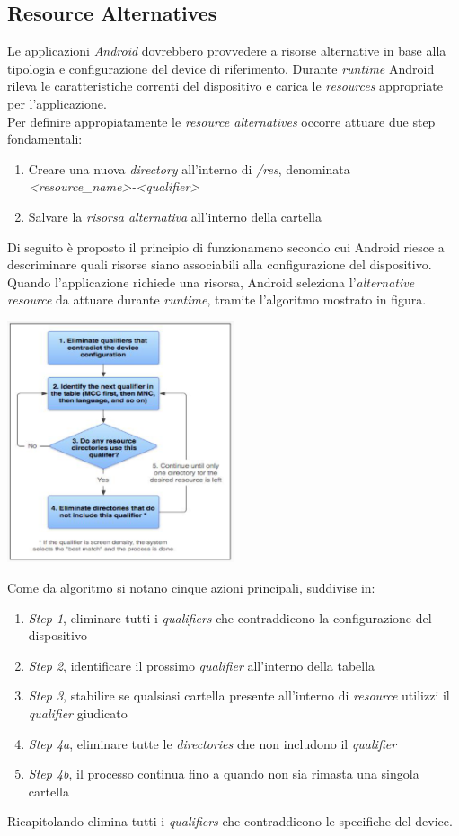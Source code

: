 \documentclass{article}
\begin{document}
\subsection*{Resource Alternatives}
Le applicazioni \textit{Android} dovrebbero provvedere a risorse alternative in base alla tipologia e configurazione del device di riferimento. Durante \textit{runtime} Android rileva le caratteristiche correnti del dispositivo e carica le \textit{resources} appropriate per l'applicazione.\vspace*{7pt}\\
Per definire appropiatamente le \textit{resource alternatives} occorre attuare due step fondamentali:
\begin{enumerate}
    \itemsep0em
    \renewcommand{\labelenumi}{-}
    \item Creare una nuova \textit{directory} all'interno di \textit{/res}, denominata \textit{<resource\_name>-<qualifier>}
    \item Salvare la \textit{risorsa alternativa} all'interno della cartella
\end{enumerate}
Di seguito è proposto il principio di funzionameno secondo cui Android riesce a descriminare quali risorse siano associabili alla configurazione del dispositivo. Quando l'applicazione richiede una risorsa, Android seleziona l'\textit{alternative resource} da attuare durante \textit{runtime}, tramite l'algoritmo mostrato in figura. 
\begin{center}
    \includegraphics[width=0.5\textwidth]{foto1.png}
\end{center}
Come da algoritmo si notano cinque azioni principali, suddivise in:
\begin{enumerate}
    \itemsep0em
    \renewcommand{\labelenumi}{-}
    \item \textit{Step 1}, eliminare tutti i \textit{qualifiers} che contraddicono la configurazione del dispositivo
    \item \textit{Step 2}, identificare il prossimo \textit{qualifier} all'interno della tabella
    \item \textit{Step 3}, stabilire se qualsiasi cartella presente all'interno di \textit{resource} utilizzi il \textit{qualifier} giudicato
    \item \textit{Step 4a}, eliminare tutte le \textit{directories} che non includono il \textit{qualifier}
    \item \textit{Step 4b}, il processo continua fino a quando non sia rimasta una singola cartella 
\end{enumerate}
Ricapitolando elimina tutti i \textit{qualifiers} che contraddicono le specifiche del device.
\end{document}

